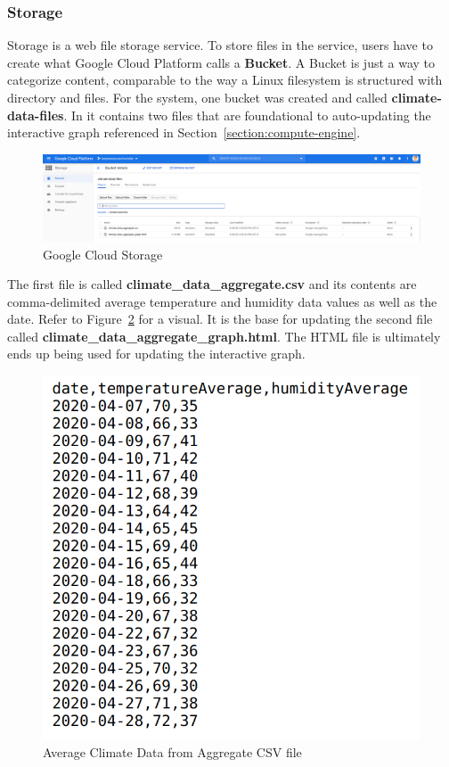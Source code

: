 \documentclass{article}
\begin{document}
\subsubsection{Storage}
Storage is a web file storage service. To store files in the service, users have to create what Google Cloud Platform calls a \textbf{Bucket}. A Bucket is just a way to categorize content, comparable to the way a Linux filesystem is structured with directory and files. For the system, one bucket was created and called \textbf{climate-data-files}. In it contains two files that are foundational to auto-updating the interactive graph referenced in Section~\ref{section:compute-engine}.

\begin{figure}[H]
    \center
    \includegraphics[width=\textwidth]{images/storage.png}
    \caption{Google Cloud Storage}
    \label{fig:storage}
\end{figure}

The first file is called \textbf{climate\_data\_aggregate.csv} and its contents are comma-delimited average temperature and humidity data values as well as the date. Refer to Figure~\ref{fig:climate-data} for a visual. It is the base for updating the second file called \textbf{climate\_data\_aggregate\_graph.html}. The HTML file is ultimately ends up being used for updating the interactive graph.

\begin{figure}[H]
    \center
    \includegraphics[width=.6\textwidth]{images/climate-data-csv.png}
    \caption{Average Climate Data from Aggregate CSV file}
    \label{fig:climate-data}
\end{figure}
\end{document}

